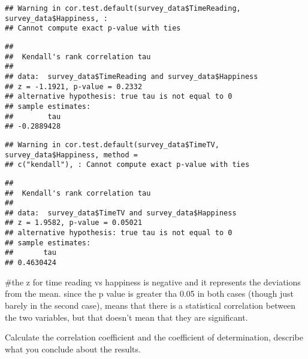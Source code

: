\documentclass[
]{article}
\newenvironment{Shaded}{\begin{snugshade}}{\end{snugshade}}
\newcommand{\AttributeTok}[1]{\textcolor[rgb]{0.77,0.63,0.00}{#1}}
\newcommand{\FloatTok}[1]{\textcolor[rgb]{0.00,0.00,0.81}{#1}}
\newcommand{\FunctionTok}[1]{\textcolor[rgb]{0.00,0.00,0.00}{#1}}
\newcommand{\NormalTok}[1]{#1}
\newcommand{\SpecialCharTok}[1]{\textcolor[rgb]{0.00,0.00,0.00}{#1}}
\newcommand{\StringTok}[1]{\textcolor[rgb]{0.31,0.60,0.02}{#1}}
\begin{document}
\begin{verbatim}
## Warning in cor.test.default(survey_data$TimeReading, survey_data$Happiness, :
## Cannot compute exact p-value with ties
\end{verbatim}

\begin{verbatim}
## 
##  Kendall's rank correlation tau
## 
## data:  survey_data$TimeReading and survey_data$Happiness
## z = -1.1921, p-value = 0.2332
## alternative hypothesis: true tau is not equal to 0
## sample estimates:
##        tau 
## -0.2889428
\end{verbatim}

\begin{Shaded}
\end{Shaded}

\begin{verbatim}
## Warning in cor.test.default(survey_data$TimeTV, survey_data$Happiness, method =
## c("kendall"), : Cannot compute exact p-value with ties
\end{verbatim}

\begin{verbatim}
## 
##  Kendall's rank correlation tau
## 
## data:  survey_data$TimeTV and survey_data$Happiness
## z = 1.9582, p-value = 0.05021
## alternative hypothesis: true tau is not equal to 0
## sample estimates:
##       tau 
## 0.4630424
\end{verbatim}

\#the z for time reading vs happiness is negative and it represents the
deviations from the mean. since the p value is greater tha 0.05 in both
cases (though just barely in the second case), means that there is a
statistical correlation between the two variables, but that doesn't mean
that they are significant.

Calculate the correlation coefficient and the coefficient of
determination, describe what you conclude about the results.

\begin{Shaded}
\end{Shaded}
\end{document}
